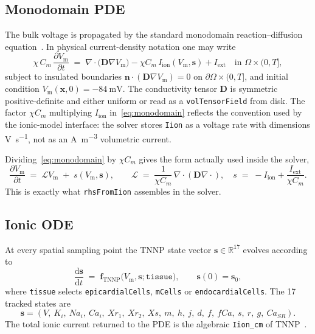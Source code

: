 \documentclass[11pt,a4paper]{article}
\newcommand{\code}[1]{\texttt{\small #1}}
\newcommand{\Vm}{V_{\text{m}}}
\newcommand{\Iion}{I_{\mathrm{ion}}}
\newcommand{\Dten}{\mathbf{D}}
\newcommand{\grad}{\nabla}
\newcommand{\divg}{\nabla\!\cdot}
\newcommand{\R}{\mathbb{R}}
\newcommand{\Iext}{I_{\mathrm{ext}}}
\begin{document}
\subsection{Monodomain PDE}

The bulk voltage is propagated by the standard monodomain
reaction--diffusion equation~\cite{ttp2004,niederer2012}. In physical
current-density notation one may write
\begin{equation}
  \chi \, C_{m} \, \frac{\partial \Vm}{\partial t}
   \;=\;
   \divg\!\bigl( \Dten \grad \Vm \bigr)
   - \chi C_m\,\Iion(\Vm, \mathbf{s})
   + \Iext
   \quad \text{in } \Omega \times (0, T],
   \label{eq:monodomain}
\end{equation}
subject to insulated boundaries
$\mathbf{n} \cdot ( \Dten \grad \Vm ) = 0$ on
$\partial \Omega \times (0, T]$, and initial condition
$\Vm(\mathbf{x}, 0) = -\SI{84}{\milli\volt}$. The conductivity tensor
$\Dten$ is symmetric positive-definite and either uniform or read as a
\code{volTensorField} from disk. The factor $\chi C_m$ multiplying
$\Iion$ in~\eqref{eq:monodomain} reflects the convention used by the
ionic-model interface: the solver stores \code{Iion} as a voltage rate
with dimensions \si{\volt\per\second}, not as an
\si{\ampere\per\meter\cubed} volumetric current.

Dividing~\eqref{eq:monodomain} by $\chi C_{m}$ gives the form actually
used inside the solver,
\begin{equation}
  \frac{\partial \Vm}{\partial t}
   \;=\;
   \mathcal{L} \Vm
   \;+\;
   s(\Vm, \mathbf{s}),
   \qquad
   \mathcal{L} \;=\; \frac{1}{\chi C_{m}}\,\divg(\Dten \grad \cdot),
   \quad
   s \;=\; -\Iion + \frac{\Iext}{\chi C_{m}}.
   \label{eq:semi-discrete}
\end{equation}
This is exactly what \code{rhsFromIion} assembles in the solver.

\subsection{Ionic ODE}

At every spatial sampling point the TNNP state vector
$\mathbf{s} \in \R^{17}$ evolves according to
\begin{equation}
  \frac{\mathrm{d}\mathbf{s}}{\mathrm{d}t}
   \;=\;
   \mathbf{f}_{\text{TNNP}}\!\bigl(\Vm, \mathbf{s}; \texttt{tissue}\bigr),
   \qquad \mathbf{s}(0) = \mathbf{s}_{0},
   \label{eq:tnnp}
\end{equation}
where \code{tissue} selects \code{epicardialCells}, \code{mCells} or
\code{endocardialCells}. The 17 tracked states are
\[
  \mathbf{s} = (V,\ K_{i},\ Na_{i},\ Ca_{i},\ Xr_{1},\ Xr_{2},\ Xs,\ m,\ h,\ j,\ d,\ f,\ fCa,\ s,\ r,\ g,\ Ca_{SR}).
\]
The total ionic current returned to the PDE is the algebraic
\code{Iion\_cm} of TNNP~\cite{ttp2004}.
\end{document}
